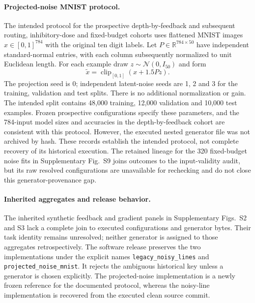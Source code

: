 \paragraph{Projected-noise MNIST protocol.}
The intended protocol for the prospective depth-by-feedback and subsequent routing, inhibitory-dose and fixed-budget cohorts uses flattened MNIST images $x\in[0,1]^{784}$ with the original ten digit labels. Let $P\in\mathbb R^{784\times50}$ have independent standard-normal entries, with each column subsequently normalized to unit Euclidean length. For each example draw $z\sim\mathcal N(0,I_{50})$ and form
\begin{equation}
 \widetilde x=\operatorname{clip}_{[0,1]}(x+1.5Pz).
 \label{eq:projected_noise_mnist}
\end{equation}
The projection seed is 0; independent latent-noise seeds are 1, 2 and 3 for the training, validation and test splits. There is no additional normalization or gain. The intended split contains 48,000 training, 12,000 validation and 10,000 test examples. Frozen prospective configurations specify these parameters, and the 784-input model sizes and accuracies in the depth-by-feedback cohort are consistent with this protocol. However, the executed nested generator file was not archived by hash. These records establish the intended protocol, not complete recovery of its historical execution. The retained lineage for the 320 fixed-budget noise fits in Supplementary Fig.~S9 joins outcomes to the input-validity audit, but its raw resolved configurations are unavailable for rechecking and do not close this generator-provenance gap.

\paragraph{Inherited aggregates and release behavior.}
The inherited synthetic feedback and gradient panels in Supplementary Figs.~S2 and S3 lack a complete join to executed configurations and generator bytes. Their task identity remains unresolved; neither generator is assigned to those aggregates retrospectively. The software release preserves the two implementations under the explicit names \texttt{legacy\_noisy\_lines} and \texttt{projected\_noise\_mnist}. It rejects the ambiguous historical key unless a generator is chosen explicitly. The projected-noise implementation is a newly frozen reference for the documented protocol, whereas the noisy-line implementation is recovered from the executed clean source commit.
